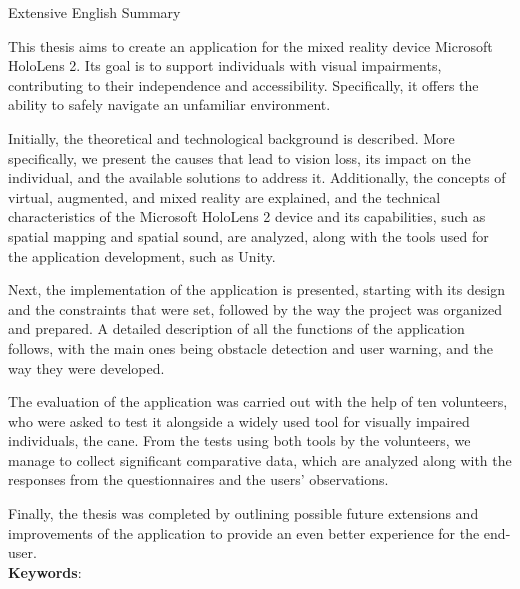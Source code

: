 \pagestyle{plain}
\begin{center}
{\LARGE Extensive English Summary}\\[1cm]
\end{center}

\setlength{\parindent}{0pt}
This thesis aims to create an application for the mixed reality device Microsoft HoloLens 2. Its goal is to support individuals with visual impairments, contributing to their independence and accessibility. Specifically, it offers the ability to safely navigate an unfamiliar environment.

Initially, the theoretical and technological background is described. More specifically, we present the causes that lead to vision loss, its impact on the individual, and the available solutions to address it. Additionally, the concepts of virtual, augmented, and mixed reality are explained, and the technical characteristics of the Microsoft HoloLens 2 device and its capabilities, such as spatial mapping and spatial sound, are analyzed, along with the tools used for the application development, such as Unity.

Next, the implementation of the application is presented, starting with its design and the constraints that were set, followed by the way the project was organized and prepared. A detailed description of all the functions of the application follows, with the main ones being obstacle detection and user warning, and the way they were developed.

The evaluation of the application was carried out with the help of ten volunteers, who were asked to test it alongside a widely used tool for visually impaired individuals, the cane. From the tests using both tools by the volunteers, we manage to collect significant comparative data, which are analyzed along with the responses from the questionnaires and the users' observations.

Finally, the thesis was completed by outlining possible future extensions and improvements of the application to provide an even better experience for the end-user.
\\[\baselineskip]
\textbf{Keywords}: {\keywordsEnglish}